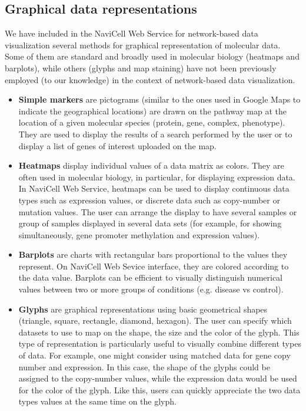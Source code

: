 \documentclass[a4,center,fleqn]{NAR}
\begin{document}
\subsection{Graphical data representations}

We have included in the NaviCell Web Service for network-based data visualization several methods
for graphical representation of molecular data. Some of them are standard
and broadly used in molecular biology (heatmaps and barplots), while others (glyphs and map
staining) have not been previously employed (to our knowledge) in the context of network-based
data visualization.

\begin{itemize}

\item \textbf{Simple markers} are pictograms (similar to the ones used in Google Maps
to indicate the geographical locations) are drawn on the pathway map at the location
of a given molecular species (protein, gene, complex, phenotype). They are used to display the
results of a search performed by the user or to display a list of genes of interest
uploaded on the map.

\item \textbf{Heatmaps} display individual values of a data matrix as
colors. They are often used in molecular biology, in particular, for displaying expression
data. In NaviCell Web Service, heatmaps can be used to
display continuous data types such as expression values, or discrete data such
as copy-number or mutation values. The user can arrange the display to have
several samples or group of samples displayed in several data sets
(for example, for showing simultaneously, gene promoter methylation and expression values).

\item \textbf{Barplots} are charts with rectangular bars proportional to the values
they represent. On NaviCell Web Sevice interface, they are colored according to the
data value. Barplots can be efficient to visually distinguish numerical
values between two or more groups of conditions (e.g. disease vs control).

\item \textbf{Glyphs} are graphical representations using basic geometrical
shapes (triangle, square, rectangle, diamond, hexagon). The user can specify
which datasets to use to map on the shape, the size and the color of the glyph. This
type of representation is particularly useful to visually combine different
types of data. For example, one might consider using matched data for
gene copy number and expression. In this case, the shape of the
glyphs could be assigned to the copy-number values, while the expression data
would be used for the color of the glyph. Like this, users can quickly
appreciate the two data types values at the same time on the glyph.


\end{itemize}
\end{document}
